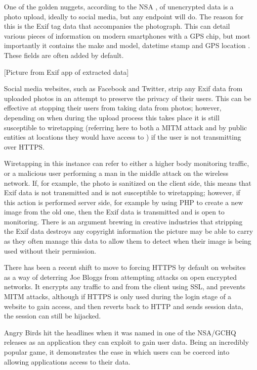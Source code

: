One of the golden nuggets, according to the NSA \cite{intro:angry_leak}, of unencrypted data is a photo upload, ideally to social media, but any endpoint will do. The reason for this is the Exif \cite{intro:exif_wiki} tag data that accompanies the photograph. This can detail various pieces of information on modern smartphones with a GPS chip, but most importantly it contains the make and model, datetime stamp and GPS location \cite{intro:wiki_geotag}. These fields are often added by default. 
\begin{center}
[Picture from Exif app of extracted data]
\end{center}
Social media websites, such as Facebook and Twitter, strip any Exif data \cite{intro:twitter_exif} from uploaded photos in an attempt to preserve the privacy of their users. This can be effective at stopping their users from taking data from photos; however, depending on when during the upload process this takes place it is still susceptible to wiretapping (referring here to both a MITM attack and by public entities at locations they would have access to \cite{intro:room_641a}) if the user is not transmitting over HTTPS. 

Wiretapping in this instance can refer to either a higher body monitoring traffic, or a malicious user performing a man in the middle attack on the wireless network. If, for example, the photo is sanitized on the client side, this means that Exif data is not transmitted and is not susceptible to wiretapping; however, if this action is performed server side, for example by using PHP to create a new image from the old one, then the Exif data is transmitted and is open to monitoring. There is an argument brewing in creative industries that stripping the Exif data destroys any copyright information the picture may be able to carry as they often manage this data to allow them to detect when their image is being used without their permission.

There has been a recent shift to move to forcing HTTPS by default on websites as a way of deterring Joe Bloggs from attempting attacks on open encrypted networks. It encrypts any traffic to and from the client using SSL, and prevents MITM attacks, although if HTTPS is only used during the login stage of a website to gain access, and then reverts back to HTTP and sends session data, the session can still be hijacked.

Angry Birds hit the headlines when it was named in one of the NSA/GCHQ releases as an application they can exploit to gain user data. Being an incredibly popular game, it demonstrates the ease in which users can be coerced into allowing applications access to their data.

